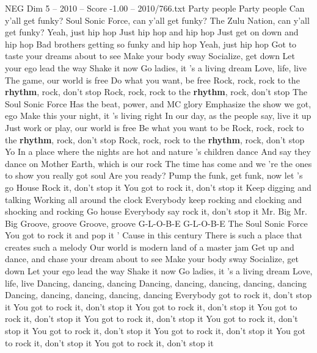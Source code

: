 \begin{textsample}{NEG Dim 5 – 2010 – Score -1.00 – 2010/766.txt}  \label{ex:f5_neg_008}
Party people Party people Can y'all get funky?
Soul Sonic Force, can y'all get funky?
The Zulu Nation, can y'all get funky?
Yeah, just hip hop Just hip hop and hip hop Just get on down and hip hop Bad brothers getting so funky and hip hop Yeah, just hip hop Got to taste your dreams about to see Make your body sway Socialize, get down Let your ego lead the way Shake it now Go ladies, it 's a living dream Love, life, live The game, our world is free Do what you want, be free Rock, rock, rock to the \textbf{rhythm}, rock, don't stop Rock, rock, rock to the \textbf{rhythm}, rock, don't stop The Soul Sonic Force Has the beat, power, and MC glory Emphasize the show we got, ego Make this your night, it 's living right In our day, as the people say, live it up Just work or play, our world is free Be what you want to be Rock, rock, rock to the \textbf{rhythm}, rock, don't stop Rock, rock, rock to the \textbf{rhythm}, rock, don't stop Yo In a place where the nights are hot and nature 's children dance And say they dance on Mother Earth, which is our rock The time has come and we 're the ones to show you really got soul Are you ready?
Pump the funk, get funk, now let 's go House Rock it, don't stop it You got to rock it, don't stop it Keep digging and talking Working all around the clock Everybody keep rocking and clocking and shocking and rocking Go house Everybody say rock it, don't stop it Mr.
Big Mr.
Big Groove, groove Groove, groove G-L-O-B-E G-L-O-B-E The Soul Sonic Force You got to rock it and pop it ' Cause in this century There is such a place that creates such a melody Our world is modern land of a master jam Get up and dance, and chase your dream about to see Make your body sway Socialize, get down Let your ego lead the way Shake it now Go ladies, it 's a living dream Love, life, live Dancing, dancing, dancing Dancing, dancing, dancing, dancing, dancing Dancing, dancing, dancing, dancing, dancing Everybody got to rock it, don't stop it You got to rock it, don't stop it You got to rock it, don't stop it You got to rock it, don't stop it You got to rock it, don't stop it You got to rock it, don't stop it You got to rock it, don't stop it You got to rock it, don't stop it You got to rock it, don't stop it You got to rock it, don't stop it

\end{textsample}
